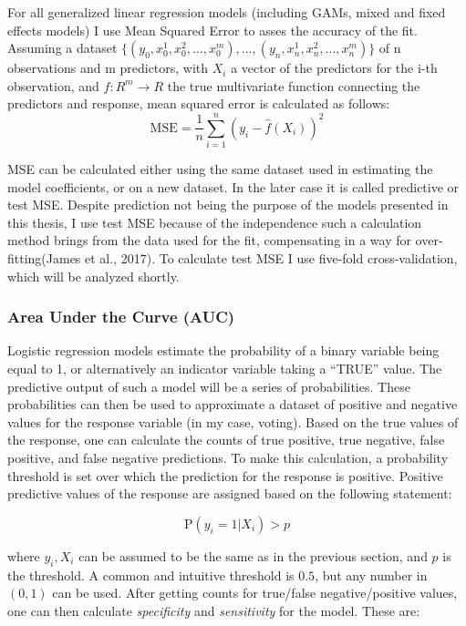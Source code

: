 \documentclass[12pt,twoside]{reedthesis}
\begin{document}
  For all generalized linear regression models (including GAMs, mixed and
  fixed effects models) I use Mean Squared Error to asses the accuracy of
  the fit. Assuming a dataset
  \(\{(y_0, x_0^1, x_0^2, ..., x_0^m),...,(y_n, x_n^1, x_n^2, ..., x_n^m)\}\)
  of n observations and m predictors, with \(X_i\) a vector of the
  predictors for the i-th observation, and \(f:R^m \to R\) the true
  multivariate function connecting the predictors and response, mean
  squared error is calculated as follows:
  \[\text{MSE} = \frac{1}{n}\sum_{i=1}^{n}(y_i - \hat{f}(X_i))^2\]
  
  MSE can be calculated either using the same dataset used in estimating
  the model coefficients, or on a new dataset. In the later case it is
  called predictive or test MSE. Despite prediction not being the purpose
  of the models presented in this thesis, I use test MSE because of the
  independence such a calculation method brings from the data used for the
  fit, compensating in a way for over-fitting(James et al., 2017). To
  calculate test MSE I use five-fold cross-validation, which will be
  analyzed shortly.
  
  \subsubsection{Area Under the Curve
  (AUC)}\label{area-under-the-curve-auc}
  
  Logistic regression models estimate the probability of a binary variable
  being equal to 1, or alternatively an indicator variable taking a
  ``TRUE'' value. The predictive output of such a model will be a series
  of probabilities. These probabilities can then be used to approximate a
  dataset of positive and negative values for the response variable (in my
  case, voting). Based on the true values of the response, one can
  calculate the counts of true positive, true negative, false positive,
  and false negative predictions. To make this calculation, a probability
  threshold is set over which the prediction for the response is positive.
  Positive predictive values of the response are assigned based on the
  following statement:
  
  \[\text{P}(y_i = 1|X_i) > p\]
  
  where \(y_i, X_i\) can be assumed to be the same as in the previous
  section, and \(p\) is the threshold. A common and intuitive threshold is
  \(0.5\), but any number in \((0,1)\) can be used. After getting counts
  for true/false negative/positive values, one can then calculate
  \emph{specificity} and \emph{sensitivity} for the model. These are:
  
\end{document}
